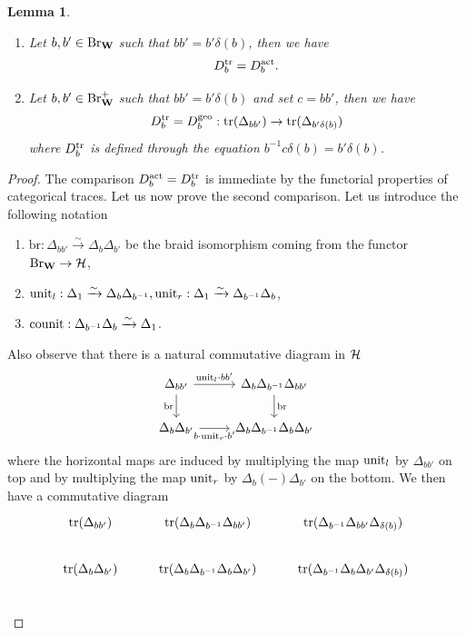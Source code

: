 \documentclass[article, 10pt, oneside, reqno]{amsart}
\theoremstyle{plain}
\newtheorem{lem}[thm]{Lemma}
\theoremstyle{definition}
\theoremstyle{remark}
\newcommand{\br}{\mathrm{br}}
\begin{document}
\begin{lem}
\begin{enumerate}
\item Let $b,b' \in \mathrm{Br}_{\mathbf{W}}$ such that $bb' = b'\delta(b)$, then we have 
$$D_b^{\mathrm{tr}} = D^{\mathrm{act}}_b.$$
\item Let $b,b' \in \mathrm{Br}_{\mathbf{W}}^+$ such that $bb' = b'\delta(b)$ and set $c = bb'$, then we have 
$$D_b^{\mathrm{tr}} = D_b^{\mathrm{geo}} : \mathrm{tr}(\Delta_{bb'}) \to \mathrm{tr}(\Delta_{b'\delta(b)})$$
where $D_b^{\mathrm{tr}}$ is defined through the equation $b^{-1}c\delta(b) = b'\delta(b)$.
\end{enumerate}
\end{lem} 

\begin{proof}
The comparison $D^{\mathrm{act}}_b = D^{\mathrm{tr}}_b$ is immediate by the functorial properties of categorical traces. Let us now prove the second comparison. Let us introduce the following notation 
\begin{enumerate}
\item $\br : \Delta_{bb'} \xrightarrow{\sim} \Delta_b \Delta_{b'}$ be the braid isomorphism coming from the functor $\mathrm{Br}_{\mathbf{W}} \to \mathcal{H}$,
\item $\mathrm{unit}_l : \Delta_1 \xrightarrow{\sim} \Delta_b \Delta_{b^{-1}}, \mathrm{unit}_r : \Delta_1 \xrightarrow{\sim} \Delta_{b^{-1}} \Delta_b$, 
\item $\mathrm{counit} : \Delta_{b^{-1}}\Delta_b \xrightarrow{\sim} \Delta_1$.
\end{enumerate}
Also observe that there is a natural commutative diagram in $\mathcal{H}$ 
\[\begin{tikzcd}
	{\Delta_{bb'}} & {\Delta_b\Delta_{b^{-1}}\Delta_{bb'}} \\
	{\Delta_{b}\Delta_{b'}} & {\Delta_b\Delta_{b^{-1}}\Delta_{b}\Delta_{b'}}
	\arrow["{\unit_l \cdot bb'}", from=1-1, to=1-2]
	\arrow["\br"', from=1-1, to=2-1]
	\arrow["\br", from=1-2, to=2-2]
	\arrow["{b\cdot \unit_r \cdot b'}"', from=2-1, to=2-2]
\end{tikzcd}\]
where the horizontal maps are induced by multiplying the map $\mathrm{unit}_l$ by $\Delta_{bb'}$ on top and by multiplying the map $\mathrm{unit}_r$ by $\Delta_b (-) \Delta_{b'}$ on the bottom. 
We then have a commutative diagram 
\[\begin{tikzcd}
	{\tr(\Delta_{bb'})} & {\tr(\Delta_b\Delta_{b^{-1}}\Delta_{bb'})} & {\tr(\Delta_{b^{-1}}\Delta_{bb'}\Delta_{\delta(b)})} \\
	{\tr(\Delta_b\Delta_{b'})} & {\tr(\Delta_b\Delta_{b^{-1}}\Delta_b\Delta_{b'})} & {\tr(\Delta_{b^{-1}}\Delta_b\Delta_{b'}\Delta_{\delta(b)})} \\

\end{tikzcd}\]
\end{proof}
\end{document}
